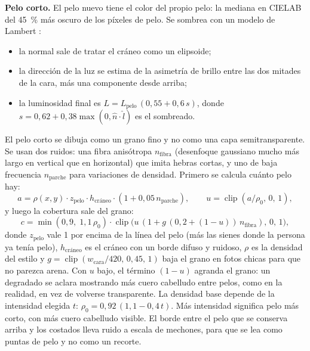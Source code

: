 \textbf{Pelo corto.} El pelo nuevo tiene el color del propio pelo: la mediana en CIELAB del 45~\% más oscuro de los píxeles de pelo. Se sombrea con un modelo de Lambert \cite{marschner2016}:
\begin{itemize}
  \item la normal sale de tratar el cráneo como un elipsoide;
  \item la dirección de la luz se estima de la asimetría de brillo entre las dos mitades de la cara, más una componente desde arriba;
  \item la luminosidad final es $L=L_{\text{pelo}}\,(0{,}55+0{,}6\,s)$, donde $s=0{,}62+0{,}38\max(0,\hat n\cdot\hat l)$ es el sombreado.
\end{itemize}
El pelo corto se dibuja como un grano fino y no como una capa semitransparente. Se usan dos ruidos: una fibra anisótropa $n_{\text{fibra}}$ (desenfoque gaussiano mucho más largo en vertical que en horizontal) que imita hebras cortas, y uno de baja frecuencia $n_{\text{parche}}$ para variaciones de densidad. Primero se calcula cuánto pelo hay:
\begin{equation}
  a = \rho(x,y)\cdot z_{\text{pelo}}\cdot h_{\text{cráneo}}\cdot(1+0{,}05\,n_{\text{parche}}),\qquad u = \operatorname{clip}(a/\rho_0,\,0,\,1),
\end{equation}
y luego la cobertura sale del grano:
\begin{equation}
  c = \min(0{,}9,\;1{,}1\,\rho_0)\cdot\operatorname{clip}\!\big(u\,(1+g\,(0{,}2+(1-u))\,n_{\text{fibra}}),\,0,\,1\big),
\end{equation}
donde $z_{\text{pelo}}$ vale 1 por encima de la línea del pelo (más las sienes donde la persona ya tenía pelo), $h_{\text{cráneo}}$ es el cráneo con un borde difuso y ruidoso, $\rho$ es la densidad del estilo y $g=\operatorname{clip}(w_{\text{cara}}/420,\,0{,}45,\,1)$ baja el grano en fotos chicas para que no parezca arena. Con $u$ bajo, el término $(1-u)$ agranda el grano: un degradado se aclara mostrando más cuero cabelludo entre pelos, como en la realidad, en vez de volverse transparente. La densidad base depende de la intensidad elegida $t$: $\rho_0=0{,}92\,(1{,}1-0{,}4\,t)$. Más intensidad significa pelo más corto, con más cuero cabelludo visible. El borde entre el pelo que se conserva arriba y los costados lleva ruido a escala de mechones, para que se lea como puntas de pelo y no como un recorte.

